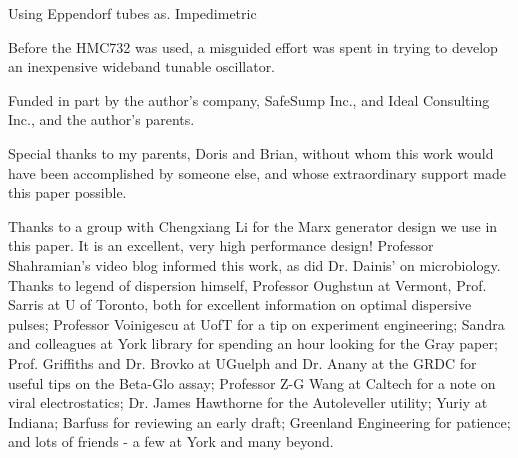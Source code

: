 \documentclass[paper.tex]{subfiles}
\begin{document}
\begin{multicols}{1}

%	


Using Eppendorf tubes as. Impedimetric 



Before the HMC732 was used, a misguided effort was spent in trying to develop an inexpensive wideband tunable oscillator. 


Funded in part by the author's company, SafeSump Inc., and Ideal Consulting Inc., and the author's parents.

Special thanks to my parents, Doris and Brian, without whom this work would have been accomplished by someone else, and whose extraordinary support made this paper possible.

Thanks to a group with Chengxiang Li for the Marx generator design we use in this paper. It is an excellent, very high performance design! Professor Shahramian's video blog informed this work, as did Dr. Dainis' on microbiology. Thanks to legend of dispersion himself, Professor Oughstun at Vermont, Prof. Sarris at U of Toronto, both for excellent information on optimal dispersive pulses; Professor Voinigescu at UofT for a tip on experiment engineering; Sandra and colleagues at York library for spending an hour looking for the Gray paper; Prof. Griffiths and Dr. Brovko at UGuelph and Dr. Anany at the GRDC for useful tips on the Beta-Glo assay; Professor Z-G Wang at Caltech for a note on viral electrostatics; Dr. James Hawthorne for the Autoleveller utility; Yuriy at Indiana; Barfuss for reviewing an early draft; Greenland Engineering for patience; and lots of friends - a few at York and many beyond. 


\end{multicols}
\end{document}

